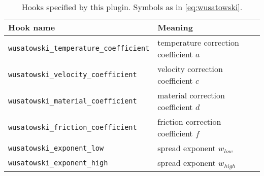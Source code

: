 \documentclass[11pt]{PyRollDocs}
\begin{document}
    \begin{table}
        \centering
        \caption{Hooks specified by this plugin. Symbols as in \autoref{eq:wusatowski}.}
        \label{tab:hookspecs}
        \begin{tabular}{ll}
            \toprule
            Hook name                                     & Meaning                                \\
            \midrule
            \texttt{wusatowski\_temperature\_coefficient} & temperature correction coefficient $a$ \\
            \texttt{wusatowski\_velocity\_coefficient}    & velocity correction coefficient $c$    \\
            \texttt{wusatowski\_material\_coefficient}    & material correction coefficient $d$    \\
            \texttt{wusatowski\_friction\_coefficient}    & friction correction coefficient $f$    \\
            \texttt{wusatowski\_exponent\_low}            & spread exponent $w_{low}$              \\
            \texttt{wusatowski\_exponent\_high}           & spread exponent $w_{high}$             \\
            \bottomrule
        \end{tabular}
    \end{table}

    \printbibliography
\end{document}
